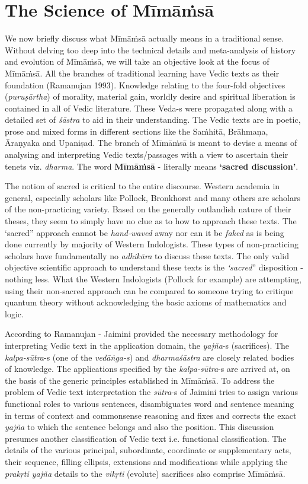 \section*{The Science of Mīmāṁsā}

We now briefly discuss what Mīmāṁsā actually means in a traditional sense. Without delving too deep into the technical details and meta-analysis of history and evolution of Mīmāṁsā, we will take an objective look at the focus of Mīmāṁsā. All the branches of traditional learning have Vedic texts as their foundation (Ramanujan 1993). Knowledge relating to the four-fold objectives (\textit{puruṣārtha}) of morality, material gain, worldly desire and spiritual liberation is contained in all of Vedic literature. These Veda-s were propagated along with a detailed set of \textit{śāstra} to aid in their understanding. The Vedic texts are in poetic, prose and mixed forms in different sections like the Saṁhitā, Brāhmaṇa, Āraṇyaka and Upaniṣad. The branch of Mīmāṁsā is meant to devise a means of analysing and interpreting Vedic texts/passages with a view to ascertain their tenets viz. \textit{dharma}. The word \textbf{Mīmāṁsā} - literally means \textbf{‘sacred discussion’}.

The notion of sacred is critical to the entire discourse. Western academia in general, especially scholars like Pollock, Bronkhorst and many others are scholars of the non-practicing variety. Based on the generally outlandish nature of their theses, they seem to simply have no clue as to how to approach these texts. The ‘sacred” approach cannot be \textit{hand-waved} away nor can it be \textit{faked} as is being done currently by majority of Western Indologists. These types of non-practicing scholars have fundamentally no \textit{adhikāra} to discuss these texts. The only valid objective scientific approach to understand these texts is the \textit{‘sacred}” disposition - nothing less. What the Western Indologists (Pollock for example) are attempting, using their non-sacred approach can be compared to someone trying to critique quantum theory without acknowledging the basic axioms of mathematics and logic.

According to Ramanujan - Jaimini provided the necessary methodology for interpreting Vedic text in the application domain, the \textit{yajña}-s (sacrifices). The \textit{kalpa-sūtra}-s (one of the \textit{vedāṅga-s}) and \textit{dharmaśāstra} are closely related bodies of knowledge. The applications specified by the \textit{kalpa-sūtra}-s are arrived at, on the basis of the generic principles established in Mīmāṁsā. To address the problem of Vedic text interpretation the \textit{sūtra}-s of Jaimini tries to assign various functional roles to various sentences, disambiguates word and sentence meaning in terms of context and commonsense reasoning and fixes and corrects the exact \textit{yajña} to which the sentence belongs and also the position. This discussion presumes another classification of Vedic text i.e. functional classification. The details of the various principal, subordinate, coordinate or supplementary acts, their sequence, filling ellipsis, extensions and modifications while applying the \textit{prakṛti yajña} details to the \textit{vikṛti} (evolute) sacrifices also comprise Mīmāṁsā.

